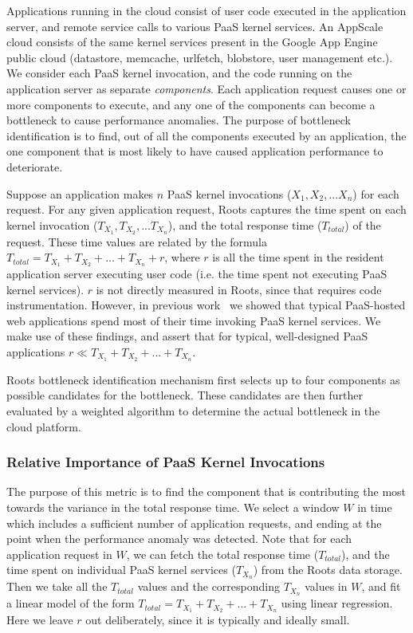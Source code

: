 Applications running in the cloud consist of user code executed in the application server, 
and remote service calls to various PaaS kernel services. An AppScale cloud
consists of the same kernel services present in the Google App Engine public cloud (datastore, memcache,
urlfetch, blobstore, user management etc.).
We consider each PaaS kernel invocation, and the code running on the application server as 
separate \textit{components}. Each application request causes one or more components to
execute, and any one of the components can become a bottleneck to cause performance anomalies.  
The purpose of bottleneck identification is to find, out of all
the components executed by an application, the one component that is most likely to have caused 
application performance to deteriorate.

Suppose an application makes $n$ PaaS kernel invocations ($X_1, X_2, ... X_n$) for each request. 
For any given application request,
Roots captures the time spent on each kernel invocation ($T_{X_1}, T_{X_2}, ... T_{X_n}$), and the 
total response time ($T_{total}$) of the request. These time values are related by the formula
$T_{total} = T_{X_1} + T_{X_2} + ... + T_{X_n} + r$, where $r$ is all the time spent in the resident 
application server executing user code (i.e. the time
spent not executing PaaS kernel services). $r$ is not
directly measured in Roots, since that requires code instrumentation.
However, in previous
work~\cite{Jayathilaka:2015:RTS:2806777.2806842} we showed that typical
PaaS-hosted web applications spend most of their time invoking PaaS kernel services.
We make use of these findings, and assert that for typical,
well-designed PaaS applications $r \ll T_{X_1} + T_{X_2} + ... + T_{X_n}$.

Roots bottleneck identification mechanism first
selects up to four components as possible candidates
for the bottleneck. These candidates are then further evaluated by a weighted algorithm to
determine the actual bottleneck in the cloud platform. 

\subsubsection{Relative Importance of PaaS Kernel Invocations} 
The purpose of this metric is to find the component that is contributing 
the most towards the variance in the total response time. 
We select a window $W$ in time which includes a sufficient number of application requests,
and ending at the point when the performance anomaly was detected. Note that for each application request
in $W$, we can fetch the total response time ($T_{total}$), and the time spent on individual PaaS kernel
services ($T_{X_n}$) from the Roots data storage.
Then we take all the $T_{total}$ values
and the corresponding $T_{X_n}$ values in $W$, and fit 
a linear model of the form 
$T_{total} = T_{X_1} + T_{X_2} + ... + T_{X_n}$
using linear regression. Here we leave $r$ out
deliberately, since it is typically and ideally small. 


